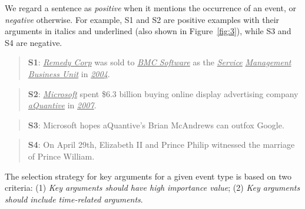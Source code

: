 We regard a sentence as \emph{positive} when it mentions the occurrence of an event, or  \emph{negative} otherwise. 
For example, S1 and S2 are positive examples with their arguments in italics and underlined (also shown in Figure~\ref{fig:3}), while S3 and S4 are negative.
%
\begin{quote}
	\textbf{S1}: \underline{\emph{Remedy Corp}} was sold to \underline{\emph{BMC Software}} as the \underline{\emph{Service}} \underline{\emph{Management Business Unit}} in \underline{\emph{2004}}.
\end{quote}
\begin{quote}
\textbf{S2}: \underline{\emph{Microsoft}} spent \$6.3 billion buying online display advertising company \underline{\emph{aQuantive}} in \underline{\emph{2007}}.
\end{quote}
\begin{quote}
\textbf{S3}: Microsoft hopes aQuantive's Brian McAndrews can outfox Google.
\end{quote}
\begin{quote}
\textbf{S4}: On April 29th, Elizabeth II and Prince Philip witnessed the marriage of Prince William.
\end{quote}

The selection strategy for key arguments for a given event type is based on two criteria: (1) \emph{Key arguments should have high importance value}; (2) \emph{Key arguments should include time-related arguments}.



